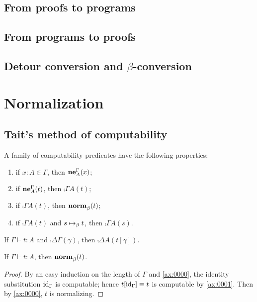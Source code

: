 \documentclass[a4paper]{article}
\begin{document}
\subsection{From proofs to programs}
\label{sec:0002}

\subsection{From programs to proofs}
\label{sec:0003}

\subsection{Detour conversion and $\beta$-conversion}
\label{sec:0005}

\section{Normalization}
\label{sec:0004}

\subsection{Tait's method of computability}
\label{sec:0006}

\begin{axiom}\label{ax:0000}
  A family of computability predicates have the following properties:
  \begin{enumerate}
  \item if $x : A \in \Gamma$, then $\operatorname{\mathbf{ne}}^{\Gamma}_{A}(x)$;
  \item if $\operatorname{\mathbf{ne}}^{\Gamma}_{A}(t)$, then $\comp{\Gamma}{A}(t)$;
  \item if $\comp{\Gamma}{A}(t)$, then $\operatorname{\mathbf{norm}}^{}_{\beta}(t)$;
  \item if $\comp{\Gamma}{A}(t)$ and $s \bRed t$, then $\comp{\Gamma}{A}(s)$.
  \end{enumerate}
\end{axiom}

\begin{axiom}\label{ax:0001}
  If $\Gamma \vdash t : A$ and $\comp{\Delta}{\Gamma}(\gamma)$, then $\comp{\Delta}{A}(t[\gamma])$.
\end{axiom}

\begin{theorem}[Normalization]\label{thm:0000}
  If $\Gamma \vdash t : A$, then $\operatorname{\mathbf{norm}}^{}_{\beta}(t)$.
\end{theorem}
\begin{proof}
  By an easy induction on the length of $\Gamma$ and \cref{ax:0000}, the identity substitution $\mathrm{id}_{\Gamma}$ is computable; hence $t[\mathrm{id}_{\Gamma}] \equiv t$ is computable by \cref{ax:0001}.
  Then by \cref{ax:0000}, $t$ is normalizing.
\end{proof}
\end{document}
